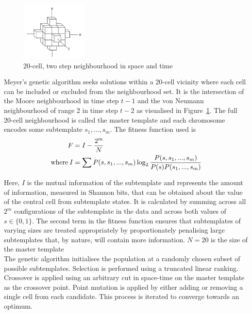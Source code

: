 \begin{figure}[!h]
\centering
\includegraphics[width=0.3\textwidth]{images/20_neighbourhood.png}
\caption{20-cell, two step neighbourhood in space and time}
\label{fig:20-near}
\end{figure}

Meyer's genetic algorithm seeks solutions within a 20-cell vicinity where each cell can be included or excluded from the neighbourhood set. It is the intersection of the Moore neighbourhood in time step $t-1$ and the von Neumann neighbourhood of range 2 in time step $t-2$ as visualised in Figure~\ref{fig:20-near}. The full 20-cell neighbourhood is called the master template and each chromosome encodes some subtemplate ${s_1, ..., s_m}$. The fitness function used is
\begin{align*}
                    F &= I - \frac{2^m}{N}\\
    \text{where\:}  I &= \sum P(s, s_1, ..., s_m)\log_2{\frac{P(s, s_1, ..., s_m)}{P(s)P(s_1, ..., s_m)}}
\end{align*}

Here, $I$ is the mutual information of the subtemplate and represents the amount of information, measured in Shannon bits, that can be obtained about the value of the central cell from subtemplate states. It is calculated by summing across all $2^m$ configurations of the subtemplate in the data and across both values of $s \in \{0,1\}$. The second term in the fitness function ensures that subtemplates of varying sizes are treated appropriately by proportionately penalising large subtemplates that, by nature, will contain more information. $N=20$ is the size of the master template\\

The genetic algorithm initialises the population at a randomly chosen subset of possible subtemplates. Selection is performed using a truncated linear ranking. Crossover is applied using an arbitrary cut in space-time on the master template as the crossover point. Point mutation is applied by either adding or removing a single cell from each candidate. This process is iterated to converge towards an optimum.\\

